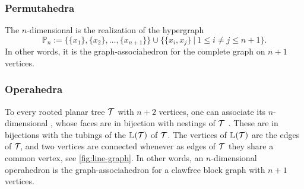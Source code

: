 \subsubsection{Permutahedra}
The $n$-dimensional  is the realization of the hypergraph 
$$\mathbb{P}_n:=\{\{x_1\},\{x_2\},\ldots,\{x_{n+1}\}\} \cup \{\{x_i,x_j\} \ | \ 1 \leq i \neq j \leq n+1 \}.$$
In other words, it is the graph-associahedron for the complete graph on $n+1$ vertices.

\subsubsection{Operahedra}
To every rooted planar tree $\mathcal{T}$ with $n+2$ vertices, one can associate its $n$-dimensional , whose faces are in bijection with nestings of $\mathcal{T}$ \cite{laplante-anfossiDiagonalOperahedra2022a,CLA1}.
These are in bijections with the tubings of the  $\mathbb{L}(\mathcal{T})$ of $\mathcal{T}$.
The vertices of $\mathbb{L}(\mathcal{T})$ are the edges of ${\cal T}\!$, and two vertices are connected whenever as edges of ${\cal T}$ they share a common vertex, see \cref{fig:line-graph}.
In other words, an $n$-dimensional operahedron is the graph-associahedron for a clawfree block graph with $n+1$ vertices.

